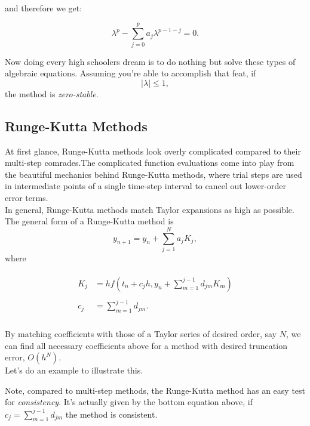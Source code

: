 \documentclass[paper=a4, fontsize=11pt]{scrartcl} %
\numberwithin{equation}{section} %
\numberwithin{figure}{section} %
\numberwithin{table}{section} %
\begin{document}
and therefore we get:

$$\lambda^p - \sum_{j=0}^{p} a_{j} \lambda^{p-1-j} = 0.$$

Now doing every high schoolers dream is to do nothing but solve these types of algebraic equations. Assuming you're able to accomplish that feat, if $$|\lambda| \leq 1,$$ the method is \emph{zero-stable}. \\



%
%
%
%

\subsection{Runge-Kutta Methods}

$ $\\

At first glance, Runge-Kutta methods look overly complicated compared to their multi-step comrades.The complicated function evaluations come into play from the beautiful mechanics behind Runge-Kutta methods, where trial steps are used in intermediate points of a single time-step interval to cancel out lower-order error terms. \\

In general, Runge-Kutta methods match Taylor expansions as high as possible. The general form of a Runge-Kutta method is $$y_{n+1} = y_{n} + \sum_{j=1}^N a_{j} K_{j},$$ where 

\begin{align}
\nonumber
\begin{split}
K_{j} &= h f\left(t_{n}+c_{j}h, y_{n} +\sum_{m=1}^{j-1} d_{jm} K_{m}  \right) \\ \\
c_{j} &= \sum_{m=1}^{j-1} d_{jm}. \\
\end{split}
\end{align}

By matching coefficients with those of a Taylor series of desired order, say $N$, we can find all necessary coefficients above for a method with desired truncation error, $O(h^N)$.\\

Let's do an example to illustrate this. 


Note, compared to multi-step methods, the Runge-Kutta method has an easy test for \emph{consistency}. It's actually given by the bottom equation above, if $c_{j} = \sum_{m=1}^{j-1} d_{jm}$ the method is consistent.
\end{document}
